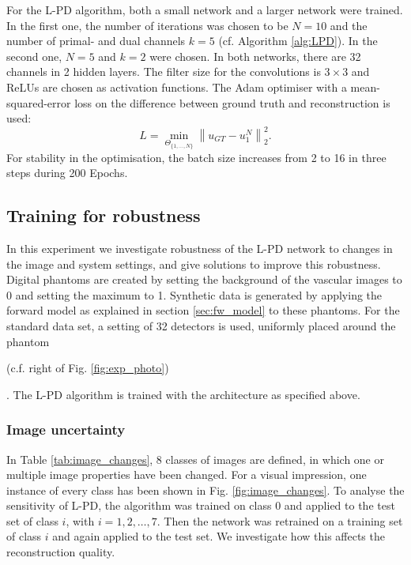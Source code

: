 \documentclass[journal]{IEEEtran}
\newcommand{\norm}[1]{\left\lVert#1\right\rVert}
\newcommand{\hl}[1]{\cbcolor{red}\begin{changebar}{#1}\end{changebar}}
\begin{document}
For the L-PD algorithm, both a small network and a larger network were trained. In the first one, the number of iterations was chosen to be $N=10$ and the number of primal- and dual channels $k=5$ (cf. Algorithm \ref{alg:LPD}). In the second one, $N=5$ and $k=2$ were chosen. In both networks, there are 32 channels in 2 hidden layers. The filter size for the convolutions is $3\times3$ and ReLUs are chosen as activation functions. The Adam optimiser \cite{Kingma2015} with a mean-squared-error loss on the difference between ground truth and reconstruction is used: 
\begin{equation}\label{eq:Loss_1}
L=\min_{\Theta_{\{1,\dots,N\}}}\norm{u_{GT}-u_1^N}^2_2.
\end{equation}
For stability in the optimisation, the batch size increases from 2 to 16 in three steps \cite{Smith2017} during 200 Epochs.

\subsection{Training for robustness}\label{sec:robustness}
In this experiment we investigate robustness of the L-PD network to changes in the image and system settings, and give solutions to improve this robustness. Digital phantoms are created by setting the background of the vascular images to 0 and setting the maximum to 1. Synthetic data is generated by applying the forward model as explained in section \ref{sec:fw_model} to these phantoms. For the standard data set, a setting of 32 detectors is used, uniformly placed around the phantom \hl{(c.f. right of Fig. \ref{fig:exp_photo})}. The L-PD algorithm is trained with the architecture as specified above. 

\subsubsection{Image uncertainty}
In Table \ref{tab:image_changes}, 8 classes of images are defined, in which one or multiple image properties have been changed. For a visual impression, one instance of every class has been shown in Fig. \ref{fig:image_changes}. To analyse the sensitivity of L-PD, the algorithm was trained on class 0 and applied to the test set of class $i$, with $i=1,2,\dots,7$. Then the network was retrained on a training set of class $i$ and again applied to the test set. We investigate how this affects the reconstruction quality. 
\end{document}

